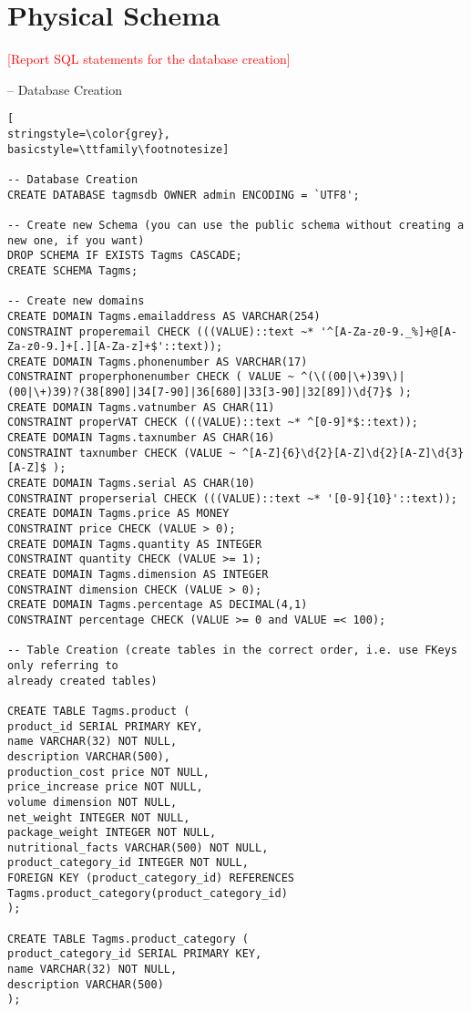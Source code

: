 \section{Physical Schema}
\textcolor{red}{[Report SQL statements for the database creation]}

-- Database Creation
\begin{lstlisting}[
stringstyle=\color{grey},
basicstyle=\ttfamily\footnotesize]

-- Database Creation
CREATE DATABASE tagmsdb OWNER admin ENCODING = `UTF8';

-- Create new Schema (you can use the public schema without creating a new one, if you want)
DROP SCHEMA IF EXISTS Tagms CASCADE;
CREATE SCHEMA Tagms;

-- Create new domains
CREATE DOMAIN Tagms.emailaddress AS VARCHAR(254)
CONSTRAINT properemail CHECK (((VALUE)::text ~* '^[A-Za-z0-9._%]+@[A-Za-z0-9.]+[.][A-Za-z]+$'::text));
CREATE DOMAIN Tagms.phonenumber AS VARCHAR(17)
CONSTRAINT properphonenumber CHECK ( VALUE ~ ^(\((00|\+)39\)|(00|\+)39)?(38[890]|34[7-90]|36[680]|33[3-90]|32[89])\d{7}$ );
CREATE DOMAIN Tagms.vatnumber AS CHAR(11)
CONSTRAINT properVAT CHECK (((VALUE)::text ~* ^[0-9]*$::text));
CREATE DOMAIN Tagms.taxnumber AS CHAR(16)
CONSTRAINT taxnumber CHECK (VALUE ~ ^[A-Z]{6}\d{2}[A-Z]\d{2}[A-Z]\d{3}[A-Z]$ );
CREATE DOMAIN Tagms.serial AS CHAR(10)
CONSTRAINT properserial CHECK (((VALUE)::text ~* '[0-9]{10}'::text));
CREATE DOMAIN Tagms.price AS MONEY
CONSTRAINT price CHECK (VALUE > 0);
CREATE DOMAIN Tagms.quantity AS INTEGER
CONSTRAINT quantity CHECK (VALUE >= 1);
CREATE DOMAIN Tagms.dimension AS INTEGER
CONSTRAINT dimension CHECK (VALUE > 0);
CREATE DOMAIN Tagms.percentage AS DECIMAL(4,1)
CONSTRAINT percentage CHECK (VALUE >= 0 and VALUE =< 100);

-- Table Creation (create tables in the correct order, i.e. use FKeys only referring to
already created tables)

CREATE TABLE Tagms.product (
product_id SERIAL PRIMARY KEY,
name VARCHAR(32) NOT NULL,
description VARCHAR(500),
production_cost price NOT NULL,
price_increase price NOT NULL,
volume dimension NOT NULL,
net_weight INTEGER NOT NULL,
package_weight INTEGER NOT NULL,
nutritional_facts VARCHAR(500) NOT NULL,
product_category_id INTEGER NOT NULL,
FOREIGN KEY (product_category_id) REFERENCES Tagms.product_category(product_category_id)
);

CREATE TABLE Tagms.product_category (
product_category_id SERIAL PRIMARY KEY,
name VARCHAR(32) NOT NULL,
description VARCHAR(500)
);


\end{lstlisting}
